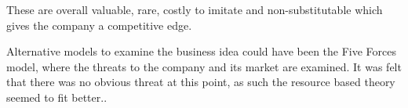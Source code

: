These are overall valuable, rare, costly to imitate and non-substitutable which gives the company a competitive edge.

Alternative models to examine the business idea could have been the Five Forces model, where the threats to the company and its market are examined.
It was felt that there was no obvious threat at this point, as such the resource based theory seemed to fit better.\citep[pg. 16]{book:jrose}.


